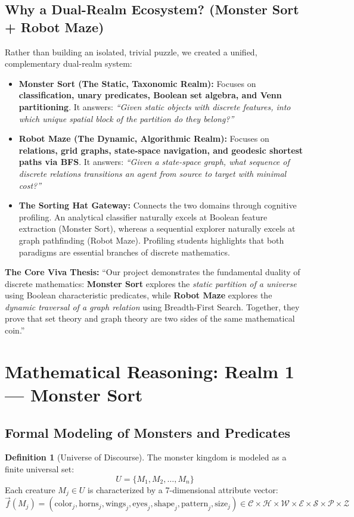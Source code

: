 \documentclass[11pt,a4paper]{article}
\theoremstyle{definition}
\newtheorem{definition}{Definition}
\begin{document}
\subsection{Why a Dual-Realm Ecosystem? (Monster Sort + Robot Maze)}
Rather than building an isolated, trivial puzzle, we created a unified, complementary dual-realm system:
\begin{itemize}
  \item \textbf{Monster Sort (The Static, Taxonomic Realm):} Focuses on \textbf{classification, unary predicates, Boolean set algebra, and Venn partitioning}. It answers: \textit{``Given static objects with discrete features, into which unique spatial block of the partition do they belong?''}
  \item \textbf{Robot Maze (The Dynamic, Algorithmic Realm):} Focuses on \textbf{relations, grid graphs, state-space navigation, and geodesic shortest paths via BFS}. It answers: \textit{``Given a state-space graph, what sequence of discrete relations transitions an agent from source to target with minimal cost?''}
  \item \textbf{The Sorting Hat Gateway:} Connects the two domains through cognitive profiling. An analytical classifier naturally excels at Boolean feature extraction (Monster Sort), whereas a sequential explorer naturally excels at graph pathfinding (Robot Maze). Profiling students highlights that both paradigms are essential branches of discrete mathematics.
\end{itemize}

\begin{conceptbox}
\textbf{The Core Viva Thesis:}
``Our project demonstrates the fundamental duality of discrete mathematics: \textbf{Monster Sort} explores the \textit{static partition of a universe} using Boolean characteristic predicates, while \textbf{Robot Maze} explores the \textit{dynamic traversal of a graph relation} using Breadth-First Search. Together, they prove that set theory and graph theory are two sides of the same mathematical coin.''
\end{conceptbox}

\newpage
\section{Mathematical Reasoning: Realm 1 --- Monster Sort}

\subsection{Formal Modeling of Monsters and Predicates}
\begin{definition}[Universe of Discourse]
The monster kingdom is modeled as a finite universal set:
$$U = \{M_1, M_2, \dots, M_n\}$$
Each creature $M_j \in U$ is characterized by a 7-dimensional attribute vector:
$$\vec{f}(M_j) = (\text{color}_j, \text{horns}_j, \text{wings}_j, \text{eyes}_j, \text{shape}_j, \text{pattern}_j, \text{size}_j) \in \mathcal{C} \times \mathcal{H} \times \mathcal{W} \times \mathcal{E} \times \mathcal{S} \times \mathcal{P} \times \mathcal{Z}$$
\end{definition}
\end{document}
